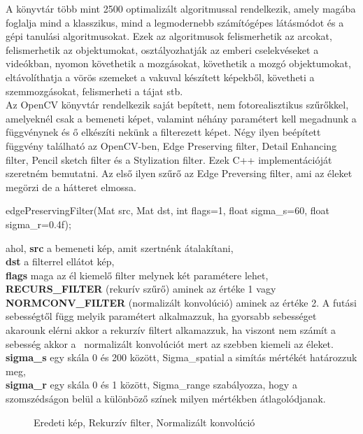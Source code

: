 \noindent A könyvtár több mint 2500 optimalizált algoritmussal rendelkezik, amely magába foglalja mind a klasszikus, mind a legmodernebb számítógépes látásmódot és a gépi tanulási algoritmusokat. Ezek az algoritmusok felismerhetik az arcokat, felismerhetik az objektumokat, osztályozhatják az emberi cselekvéseket a videókban, nyomon követhetik a mozgásokat, követhetik a mozgó objektumokat, eltávolíthatja a vörös szemeket a vakuval készített képekből, követheti a szemmozgásokat, felismerheti a tájat stb. 
\\
Az OpenCV könyvtár rendelkezik saját bepített, nem fotorealisztikus szűrőkkel, amelyeknél csak a bemeneti képet, valamint néhány paramétert kell megadnunk a függvénynek és ő elkészíti nekünk a filterezett képet. Négy ilyen beépített függvény található az OpenCV-ben, Edge Preserving filter, Detail Enhancing filter, Pencil sketch filter és a Stylization filter. Ezek C++ implementációját szeretném bemutatni.
Az első ilyen szűrő az Edge Preversing filter, ami az éleket megörzi de a hátteret elmossa. 
\begin{cpp}
edgePreservingFilter(Mat src, Mat dst, int flags=1, 
			float sigma_s=60, float sigma_r=0.4f);
\end{cpp}
ahol, \textbf{src} a bemeneti kép, amit szertnénk átalakítani,\\
\indent \textbf{dst} a filterrel ellátot kép, \\
\indent \textbf{flags} maga az él kiemelő filter melynek két paramétere lehet, \textbf{RECURS\_FILTER} (rekurív szűrő) aminek az értéke 1 vagy \textbf{NORMCONV\_FILTER} (normalizált konvolúció) aminek az értéke 2.  A futási sebességtől függ melyik paramétert alkalmazzuk, ha gyorsabb sebességet akarounk elérni akkor a rekurzív filtert alkamazzuk, ha viszont nem számít a sebesség akkor a  normalizált konvolúciót mert az szebben kiemeli az éleket.\\
\indent \textbf{sigma\_s} egy skála 0 és 200 között, Sigma\_spatial a simítás mértékét határozzuk meg, \\
\indent \textbf{sigma\_r} egy skála 0 és 1 között, Sigma\_range szabályozza, hogy a szomszédságon belül a különböző színek milyen mértékben átlagolódjanak.
\begin{figure}[ht]
\centering
{}
\caption{Eredeti kép, Rekurzív filter, Normalizált konvolúció} 
\label{fig: edgePreservingFilter}
\end{figure}
